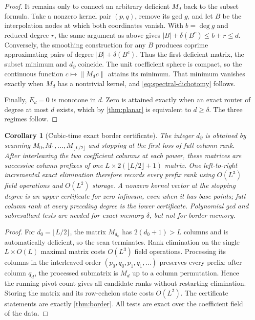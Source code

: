 \documentclass[11pt]{article}
\newtheorem{corollary}[theorem]{Corollary}
\theoremstyle{definition}\newtheorem{definition}[theorem]{Definition}\newtheorem{example}[theorem]{Example}
\theoremstyle{remark}\newtheorem{remark}[theorem]{Remark}\newtheorem{limitation}[theorem]{Limitation}
\newcommand{\norm}[1]{\lVert#1\rVert}\newcommand{\dd}{\,\mathrm d}
\begin{document}
\begin{proof}
It remains only to connect an arbitrary deficient $M_d$ back to the subset
formula.  Take a nonzero kernel pair $(p,q)$, remove its gcd $g$, and let $B$
be the interpolation nodes at which both coordinates vanish.  With
$b=\deg g$ and reduced degree $r$, the same argument as above gives
$|B|+\delta(B^c)\le b+r\le d$.  Conversely, the smoothing construction for
any $B$ produces coprime approximating pairs of degree
$|B|+\delta(B^c)$.  Thus the first deficient matrix, the subset minimum and
$d_\partial$ coincide.  The unit coefficient sphere is compact, so the
continuous function $c\mapsto\norm{M_dc}$ attains its minimum.  That minimum
vanishes exactly when $M_d$ has a nontrivial kernel, and
\eqref{eq:spectral-dichotomy} follows.

Finally, $E_d=0$ is monotone in $d$.  Zero is attained exactly when an exact
router of degree at most $d$ exists, which by \cref{thm:planar} is equivalent
to $d\ge\delta$.  The three regimes follow.
\end{proof}

\begin{corollary}[Cubic-time exact border certificate]\label{cor:border-certificate}
The integer $d_\partial$ is obtained by scanning
$M_0,M_1,\ldots,M_{\lfloor L/2\rfloor}$ and stopping at the first loss of full
column rank.  After interleaving the two coefficient columns at each power,
these matrices are successive column prefixes of one
$L\times 2(\lfloor L/2\rfloor+1)$ matrix.  One left-to-right incremental exact
elimination therefore records every prefix rank using $O(L^3)$ field
operations and $O(L^2)$ storage.  A nonzero kernel vector at the stopping
degree is an upper certificate for zero infimum, even when it has base points;
full column rank at every preceding degree is the lower certificate.
Polynomial gcd and subresultant tests are needed for exact memory $\delta$, but
not for border memory.
\end{corollary}

\begin{proof}
For $d_0=\lfloor L/2\rfloor$, the matrix $M_{d_0}$ has $2(d_0+1)>L$
columns and is automatically deficient, so the scan terminates.  Rank
elimination on the single $L\times O(L)$ maximal matrix costs $O(L^3)$ field
operations.  Processing its columns in the interleaved order
$(p_0,q_0,p_1,q_1,\ldots)$ preserves every prefix: after column $q_d$, the
processed submatrix is $M_d$ up to a column permutation.  Hence the running
pivot count gives all candidate ranks without restarting elimination.
Storing the matrix and its row-echelon state costs $O(L^2)$.  The certificate
statements are exactly \cref{thm:border}.  All tests are exact over the
coefficient field of the data.
\end{proof}
\end{document}
